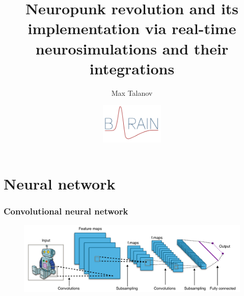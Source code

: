\documentclass[12pt, aspectratio=169]{beamer}
\title[Neuropunk revolution and its implementation via real-time neurosimulations and their integrations]{Neuropunk revolution and its implementation via real-time neurosimulations and their integrations} %
\author[Max Talanov]{
  Max Talanov
}
\institute[B-Rain Labs LLC, NcN laboratory: ITIS : KFU]%
{
B-Rain Labs LLC, 
Neuromorphic computing and Neurosimulations laboratory, ITIS, KFU \\ %
\medskip
\textit{max.talanov@gmail.com} %
}
\date{\includegraphics[width=3cm]{B-Rain_logo}} %
\begin{document}
\begin{frame}
\titlepage %
\end{frame}



\section{Neural network}
\begin{frame}
  \frametitle{Convolutional neural network}
  \begin{figure}
    \includegraphics[width=0.9\linewidth]{Typical_cnn}
  \end{figure}
\end{frame}

\end{document}
